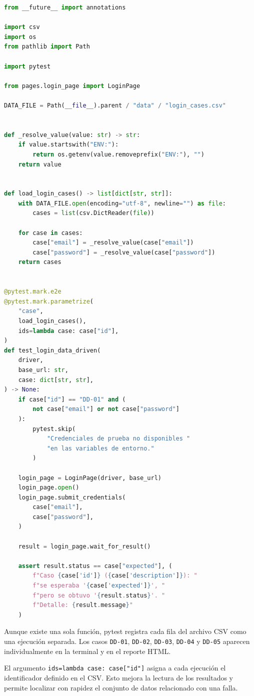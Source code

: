 \documentclass[12pt,letterpaper]{article}
\begin{document}
\begin{lstlisting}[language=Python,caption={Prueba data-driven con \texttt{@pytest.mark.parametrize}}]
from __future__ import annotations

import csv
import os
from pathlib import Path

import pytest

from pages.login_page import LoginPage

DATA_FILE = Path(__file__).parent / "data" / "login_cases.csv"


def _resolve_value(value: str) -> str:
    if value.startswith("ENV:"):
        return os.getenv(value.removeprefix("ENV:"), "")
    return value


def load_login_cases() -> list[dict[str, str]]:
    with DATA_FILE.open(encoding="utf-8", newline="") as file:
        cases = list(csv.DictReader(file))

    for case in cases:
        case["email"] = _resolve_value(case["email"])
        case["password"] = _resolve_value(case["password"])
    return cases


@pytest.mark.e2e
@pytest.mark.parametrize(
    "case",
    load_login_cases(),
    ids=lambda case: case["id"],
)
def test_login_data_driven(
    driver,
    base_url: str,
    case: dict[str, str],
) -> None:
    if case["id"] == "DD-01" and (
        not case["email"] or not case["password"]
    ):
        pytest.skip(
            "Credenciales de prueba no disponibles "
            "en las variables de entorno."
        )

    login_page = LoginPage(driver, base_url)
    login_page.open()
    login_page.submit_credentials(
        case["email"],
        case["password"],
    )

    result = login_page.wait_for_result()

    assert result.status == case["expected"], (
        f"Caso {case['id']} ({case['description']}): "
        f"se esperaba '{case['expected']}', "
        f"pero se obtuvo '{result.status}'. "
        f"Detalle: {result.message}"
    )
\end{lstlisting}

Aunque existe una sola función, pytest registra cada fila del archivo CSV como una ejecución separada. Los casos \texttt{DD-01}, \texttt{DD-02}, \texttt{DD-03}, \texttt{DD-04} y \texttt{DD-05} aparecen individualmente en la terminal y en el reporte HTML.

El argumento \texttt{ids=lambda case: case["id"]} asigna a cada ejecución el identificador definido en el CSV. Esto mejora la lectura de los resultados y permite localizar con rapidez el conjunto de datos relacionado con una falla.
\end{document}
